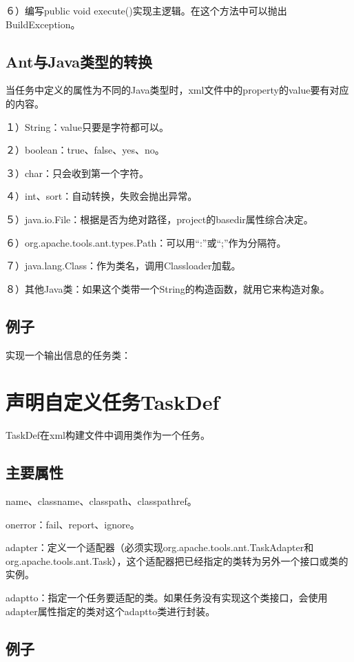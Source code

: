 ６）编写public void execute()实现主逻辑。在这个方法中可以抛出BuildException。

\subsection{Ant与Java类型的转换}

当任务中定义的属性为不同的Java类型时，xml文件中的property的value要有对应的内容。

１）String：value只要是字符都可以。

２）boolean：true、false、yes、no。

３）char：只会收到第一个字符。

４）int、sort：自动转换，失败会抛出异常。

５）java.io.File：根据是否为绝对路径，project的basedir属性综合决定。

６）org.apache.tools.ant.types.Path：可以用“:”或“;”作为分隔符。

７）java.lang.Class：作为类名，调用Classloader加载。

８）其他Java类：如果这个类带一个String的构造函数，就用它来构造对象。

\subsection{例子}

实现一个输出信息的任务类：





\section{声明自定义任务TaskDef}

TaskDef在xml构建文件中调用类作为一个任务。

\subsection{主要属性}

name、classname、classpath、classpathref。

onerror：fail、report、ignore。

adapter：定义一个适配器（必须实现org.apache.tools.ant.TaskAdapter和org.apache.tools.ant.Task），这个适配器把已经指定的类转为另外一个接口或类的实例。

adaptto：指定一个任务要适配的类。如果任务没有实现这个类接口，会使用adapter属性指定的类对这个adaptto类进行封装。



\subsection{例子}













